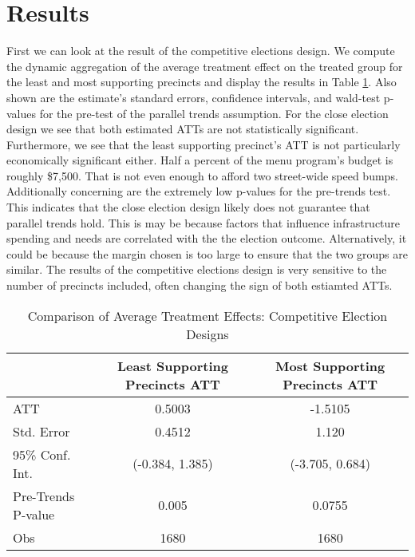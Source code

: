 \section{Results}

First we can look at the result of the competitive elections design.
We compute the dynamic aggregation of the average treatment effect on the treated group for the least and most supporting precincts and display the results in Table \ref{tab:att_comparison_close_election}.
Also shown are the estimate's standard errors, confidence intervals, and wald-test p-values for the pre-test of the parallel trends assumption.
For the close election design we see that both estimated ATTs are not statistically significant.
Furthermore, we see that the least supporting precinct's ATT is not particularly economically significant either. 
Half a percent of the menu program's budget is roughly \$7,500. 
That is not even enough to afford two street-wide speed bumps.
Additionally concerning are the extremely low p-values for the pre-trends test.
This indicates that the close election design likely does not guarantee that parallel trends hold.
This is may be because factors that influence infrastructure spending and needs are correlated with the the election outcome.
Alternatively, it could be because the margin chosen is too large to ensure that the two groups are similar.
The results of the competitive elections design is very sensitive to the number of precincts included, often changing the sign of both estiamted ATTs.
\begin{table}[ht]
    \centering
    \caption{Comparison of Average Treatment Effects: Competitive Election Designs}
    \label{tab:att_comparison_close_election}
    \begin{tabular}{lcc}
    \hline
     & Least Supporting Precincts ATT & Most Supporting Precincts ATT \\
    \hline
    ATT & 0.5003 &  -1.5105 \\
    Std. Error & 0.4512 &  1.120 \\
    95\% Conf. Int. & (-0.384, 1.385) & (-3.705, 0.684) \\
    Pre-Trends P-value & 0.005  & 0.0755 \\
    Obs & 1680 & 1680 \\
    \hline
    \end{tabular}
\end{table}

